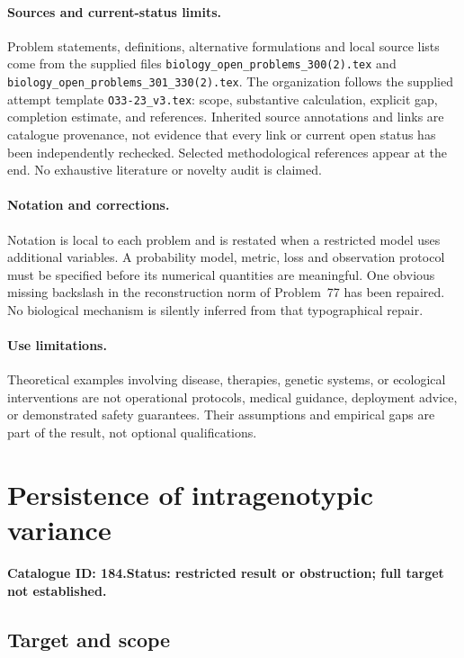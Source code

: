 \documentclass[11pt]{article}
\begin{document}
\paragraph{Sources and current-status limits.}
Problem statements, definitions, alternative formulations and local source lists
come from the supplied files
\texttt{biology\_open\_problems\_300(2).tex} and
\texttt{biology\_open\_problems\_301\_330(2).tex}.
The organization follows the supplied attempt template
\texttt{O33-23\_v3.tex}: scope, substantive calculation, explicit gap,
completion estimate, and references. Inherited source annotations and links are
catalogue provenance, not evidence that every link or current open status has
been independently rechecked. Selected methodological references appear at the
end. No exhaustive literature or novelty audit is claimed.

\paragraph{Notation and corrections.}
Notation is local to each problem and is restated when a restricted model uses
additional variables. A probability model, metric, loss and observation protocol
must be specified before its numerical quantities are meaningful. One obvious
missing backslash in the reconstruction norm of Problem~77 has been repaired.
No biological mechanism is silently inferred from that typographical repair.

\paragraph{Use limitations.}
Theoretical examples involving disease, therapies, genetic systems, or ecological
interventions are not operational protocols, medical guidance, deployment advice,
or demonstrated safety guarantees. Their assumptions and empirical gaps are part
of the result, not optional qualifications.

\setcounter{section}{183}
\section{Persistence of intragenotypic variance}
\label{prob:184}
\noindent\textbf{Catalogue ID: 184.}\quad \textbf{Status: restricted result or obstruction; full target not established.}
\subsection{Target and scope}
\end{document}
